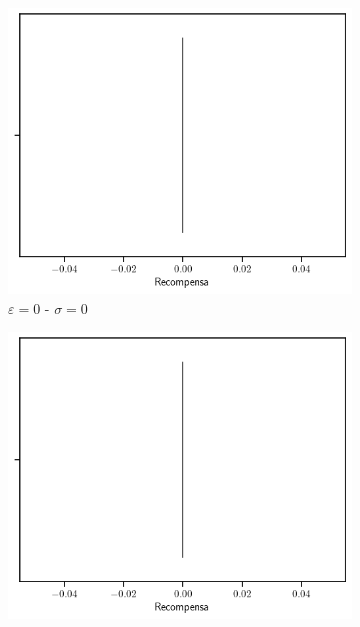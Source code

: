 \documentclass[12pt]{article}
\begin{document}
    \begin{figure}[]
        \centering

        \begin{subfigure}[H]{0.3\textwidth}
            \includegraphics[width=\textwidth]{../img/values_sigma_0_epsilon_0}
            \caption{$\varepsilon=0$ - $\sigma=0$}
            \label{fig:estimations_0}
        \end{subfigure}
        \begin{subfigure}[H]{0.3\textwidth}
            \includegraphics[width=\textwidth]{../img/values_sigma_0_epsilon_0.01}

\end{subfigure}
\end{figure}
\end{document}
